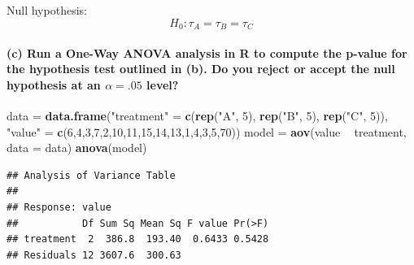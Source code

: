 \documentclass[
]{article}
\newenvironment{Shaded}{\begin{snugshade}}{\end{snugshade}}
\newcommand{\DataTypeTok}[1]{\textcolor[rgb]{0.13,0.29,0.53}{#1}}
\newcommand{\DecValTok}[1]{\textcolor[rgb]{0.00,0.00,0.81}{#1}}
\newcommand{\KeywordTok}[1]{\textcolor[rgb]{0.13,0.29,0.53}{\textbf{#1}}}
\newcommand{\NormalTok}[1]{#1}
\newcommand{\OperatorTok}[1]{\textcolor[rgb]{0.81,0.36,0.00}{\textbf{#1}}}
\newcommand{\StringTok}[1]{\textcolor[rgb]{0.31,0.60,0.02}{#1}}
\begin{document}
Null hypothesis: \[H_0:\tau_A=\tau_B=\tau_C\]

\hypertarget{c-run-a-one-way-anova-analysis-in-r-to-compute-the-p-value-for-the-hypothesis-test-outlined-in-b.-do-you-reject-or-accept-the-null-hypothesis-at-an-ux3b1.05-level}{%
\paragraph{\texorpdfstring{(c) Run a One-Way ANOVA analysis in R to
compute the p-value for the hypothesis test outlined in (b). Do you
reject or accept the null hypothesis at an \(α=.05\)
level?}{(c) Run a One-Way ANOVA analysis in R to compute the p-value for the hypothesis test outlined in (b). Do you reject or accept the null hypothesis at an α=.05 level?}}\label{c-run-a-one-way-anova-analysis-in-r-to-compute-the-p-value-for-the-hypothesis-test-outlined-in-b.-do-you-reject-or-accept-the-null-hypothesis-at-an-ux3b1.05-level}}

\begin{Shaded}
\begin{Highlighting}[]
\NormalTok{data =}\StringTok{ }\KeywordTok{data.frame}\NormalTok{(}\StringTok{"treatment"}\NormalTok{ =}\StringTok{ }\KeywordTok{c}\NormalTok{(}\KeywordTok{rep}\NormalTok{(}\StringTok{"A"}\NormalTok{, }\DecValTok{5}\NormalTok{), }\KeywordTok{rep}\NormalTok{(}\StringTok{"B"}\NormalTok{, }\DecValTok{5}\NormalTok{), }\KeywordTok{rep}\NormalTok{(}\StringTok{"C"}\NormalTok{, }\DecValTok{5}\NormalTok{)), }\StringTok{"value"}\NormalTok{ =}\StringTok{ }\KeywordTok{c}\NormalTok{(}\DecValTok{6}\NormalTok{,}\DecValTok{4}\NormalTok{,}\DecValTok{3}\NormalTok{,}\DecValTok{7}\NormalTok{,}\DecValTok{2}\NormalTok{,}\DecValTok{10}\NormalTok{,}\DecValTok{11}\NormalTok{,}\DecValTok{15}\NormalTok{,}\DecValTok{14}\NormalTok{,}\DecValTok{13}\NormalTok{,}\DecValTok{1}\NormalTok{,}\DecValTok{4}\NormalTok{,}\DecValTok{3}\NormalTok{,}\DecValTok{5}\NormalTok{,}\DecValTok{70}\NormalTok{))}
\NormalTok{model =}\StringTok{ }\KeywordTok{aov}\NormalTok{(value }\OperatorTok{~}\StringTok{ }\NormalTok{treatment, }\DataTypeTok{data =}\NormalTok{ data)}
\KeywordTok{anova}\NormalTok{(model)}
\end{Highlighting}
\end{Shaded}

\begin{verbatim}
## Analysis of Variance Table
## 
## Response: value
##           Df Sum Sq Mean Sq F value Pr(>F)
## treatment  2  386.8  193.40  0.6433 0.5428
## Residuals 12 3607.6  300.63
\end{verbatim}
\end{document}

